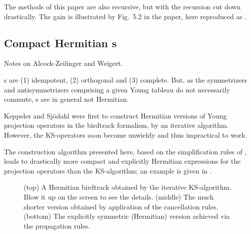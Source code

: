 The methods of this paper are also recursive, but with the recursion cut down
drastically. The gain is illustrated by Fig.~5.2 in the paper, here
reproduced as .


\subsection{Compact Hermitian \Ypo s}
\label{s-AlcZei16-2}

Notes on Alcock-Zeilinger and Weigert.

\Ypo s are (1) idempotent, (2) orthogonal and (3) complete.
But, as the symmetrizers and antisymmetrizers comprising a given Young
tableau do not necessarily commute,  \Ypo s are in general not Hermitian.

Keppeler and Sj{\"o}dahl were first to construct Hermitian
versions of Young projection operators in the birdtrack formalism, by an
iterative algorithm. However, the KS-operators soon become unwieldy and thus
impractical to work.

The construction algorithm presented here,
based on the simplification rules of ,
leads to drastically more compact and explicitly Hermitian
expressions for the projection operators than the
KS-algorithm; an example is given
in .

\begin{figure}%
  \begin{center}
  \end{center}
\caption{
(top)
A Hermitian birdtrack obtained by the iterative KS-algorithm.
Blow it up on the screen to see the details.
(middle)
The much shorter version obtained by application of the cancellation rules.
(bottom)
The explicitly symmetric (Hermitian) version achieved via the propagation
rules.
}
\label{fig:MOLDAdvantage}
\end{figure}


